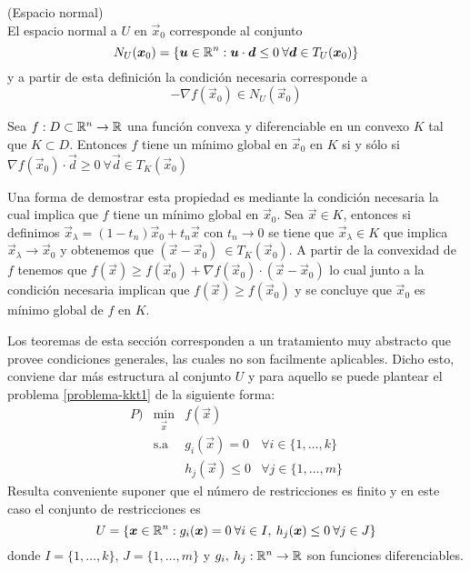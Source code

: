 \begin{definicion}{\rm (Espacio normal)}
\\El espacio normal a $U$ en $\vec{x}_0$ corresponde al conjunto
$$N_U(\boldsymbol{x}_0) = \{\boldsymbol{u}\in \mathbb{R}^n : \boldsymbol{u}\cdot \boldsymbol{d} \leq 0 \:\forall \boldsymbol{d}\in T_U(\boldsymbol{x}_0)\}$$
y a partir de esta definici\'on la condici\'on necesaria corresponde a
$$-\nabla f(\vec{x}_0) \in N_U(\vec{x}_0)$$
\end{definicion}

\begin{teorema}
Sea $f: D \subset \mathbb{R}^n \to \mathbb{R}$ una funci\'on convexa y diferenciable en un convexo $K$ tal que $K\subset D$. Entonces $f$ tiene un m\'inimo global en $\vec{x}_0$ en $K$ si y s\'olo si $ \nabla f(\vec{x}_0)\cdot \vec{d} \geq 0 \:\forall \vec{d}\in T_K(\vec{x}_0)$
\end{teorema}

\begin{demostracion}
Una forma de demostrar esta propiedad es mediante la condici\'on necesaria la cual implica que $f$ tiene un m\'inimo global en $\vec{x}_0$. Sea $\vec{x}\in K$, entonces si definimos $\vec{x}_\lambda = (1-t_n)\vec{x}_0 + t_n \vec{x}$ con $t_n \to 0$ se tiene que $\vec{x}_\lambda \in K$ que implica $\vec{x}_\lambda \to \vec{x}_0$ y obtenemos que $(\vec{x}-\vec{x}_0) \:\in T_K(\vec{x}_0)$. A partir de la convexidad de $f$ tenemos que $f(\vec{x})\geq f(\vec{x}_0) + \nabla f(\vec{x}_0) \cdot (\vec{x}-\vec{x}_0)$ lo cual junto a la condici\'on necesaria implican que $f(\vec{x})\geq f(\vec{x}_0)$ y se concluye que $\vec{x}_0$ es m\'inimo global de $f$ en $K$.
\end{demostracion}

Los teoremas de esta secci\'on corresponden a un tratamiento muy abstracto que provee condiciones generales, las cuales no son facilmente aplicables. Dicho esto, conviene dar m\'as estructura al conjunto $U$ y para aquello se puede plantear el problema \eqref{problema-kkt1} de la siguiente forma:
\begin{equation}\label{problema-kkt2}
\begin{array}{lccl}
P)  & \displaystyle \min_{\vec{x}} 	& f(\vec{x})      			& \\
	& \text{s.a}				& g_i(\vec{x})    =  	 0  	& \forall i\in\{1,\ldots,k\} \\
	&							& h_j(\vec{x})	\leq 0  	& \forall j\in\{1,\ldots,m\}
\end{array}
\end{equation}
Resulta conveniente suponer que el n\'umero de restricciones es finito y en este caso el conjunto de restricciones es
$$U=\{\boldsymbol{x}\in \mathbb{R}^n : g_i(\boldsymbol{x})=0 \:\forall i\in I,\: h_j(\boldsymbol{x})\leq 0 \:\forall j\in J \}$$
donde $I =\{1,\ldots , k\}$, $J=\{1,\ldots, m\}$ y $g_i,\:h_j : \mathbb{R}^n \rightarrow \mathbb{R}$ son funciones diferenciables.

